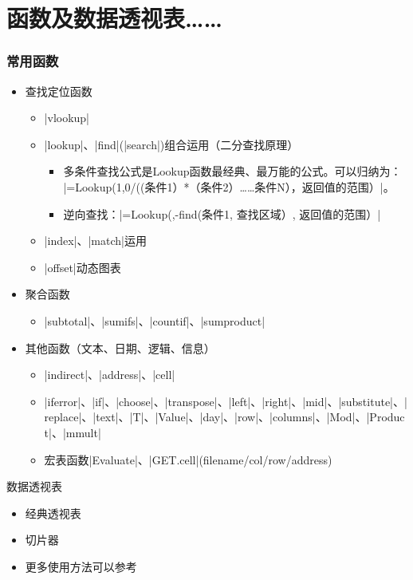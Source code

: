 \section{函数及数据透视表……}

\begin{frame}[fragile]
\frametitle{常用函数}
\pause
\begin{itemize}
	\item<+-> 查找定位函数
	
	\begin{itemize}	
		\item<+-> |vlookup|
		\item<+-> |lookup|、|find|(|search|)组合运用（二分查找原理）
		\begin{itemize}
			\item 多条件查找公式是Lookup函数最经典、最万能的公式。可以归纳为：\\		
			|=Lookup(1,0/((条件1）*（条件2）……条件N），返回值的范围）|。
			\item 逆向查找：|=Lookup(,-find(条件1, 查找区域）, 返回值的范围）|
		\end{itemize}
		\item<+-> |index|、|match|运用
		\item<+-> |offset|动态图表
	\end{itemize}
	
	\item<+-> 聚合函数
	\begin{itemize}	
		\item |subtotal|、|sumifs|、|countif|、|sumproduct|
	\end{itemize}

	\item<+-> 其他函数（文本、日期、逻辑、信息）
	\begin{itemize}
		\item<+-> |indirect|、|address|、|cell|
		\item<+-> |iferror|、|if|、|choose|、|transpose|、|left|、|right|、|mid|、|substitute|、|replace|、|text|、|T|、|Value|、|day|、|row|、|columns|、|Mod|、|Product|、|mmult|
		\item<+-> 宏表函数|Evaluate|、|GET.cell|(filename/col/row/address)
	\end{itemize}
	
\end{itemize}
\end{frame}
\begin{frame}{数据透视表}
	\begin{itemize}
		\item<+-> 经典透视表
		\item<+-> 切片器
		\item<+-> 更多使用方法可以参考
	\end{itemize}
\end{frame}
